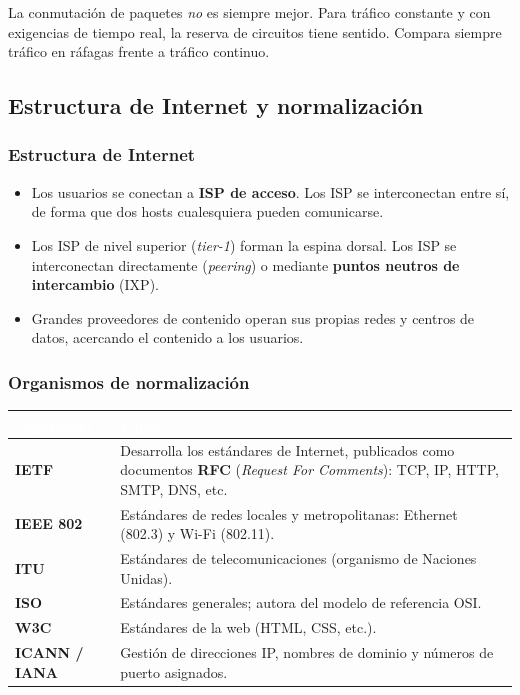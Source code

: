 \documentclass[11pt,a4paper]{article}
\newcommand{\hd}[1]{\cellcolor{uahblue}\textcolor{white}{\textbf{#1}}}
\begin{document}
\begin{ojo}
La conmutación de paquetes \emph{no} es siempre mejor. Para tráfico constante y con exigencias de tiempo real, la reserva de circuitos tiene sentido. Compara siempre tráfico en ráfagas frente a tráfico continuo.
\end{ojo}

\subsection{Estructura de Internet y normalización}

\subsubsection{Estructura de Internet}
\begin{itemize}
  \item Los usuarios se conectan a \textbf{ISP de acceso}. Los ISP se interconectan entre sí, de forma que dos hosts cualesquiera pueden comunicarse.
  \item Los ISP de nivel superior (\emph{tier-1}) forman la espina dorsal. Los ISP se interconectan directamente (\emph{peering}) o mediante \textbf{puntos neutros de intercambio} (IXP).
  \item Grandes proveedores de contenido operan sus propias redes y centros de datos, acercando el contenido a los usuarios.
\end{itemize}

\subsubsection{Organismos de normalización}

\begin{tabularx}{\textwidth}{@{}L{3.2cm}X@{}}
\toprule
\hd{Organismo} & \hd{Papel} \\
\midrule
\textbf{IETF} & Desarrolla los estándares de Internet, publicados como documentos \textbf{RFC} (\emph{Request For Comments}): TCP, IP, HTTP, SMTP, DNS, etc. \\
\textbf{IEEE 802} & Estándares de redes locales y metropolitanas: Ethernet (802.3) y Wi-Fi (802.11). \\
\textbf{ITU} & Estándares de telecomunicaciones (organismo de Naciones Unidas). \\
\textbf{ISO} & Estándares generales; autora del modelo de referencia OSI. \\
\textbf{W3C} & Estándares de la web (HTML, CSS, etc.). \\
\textbf{ICANN / IANA} & Gestión de direcciones IP, nombres de dominio y números de puerto asignados. \\
\bottomrule
\end{tabularx}
\end{document}
